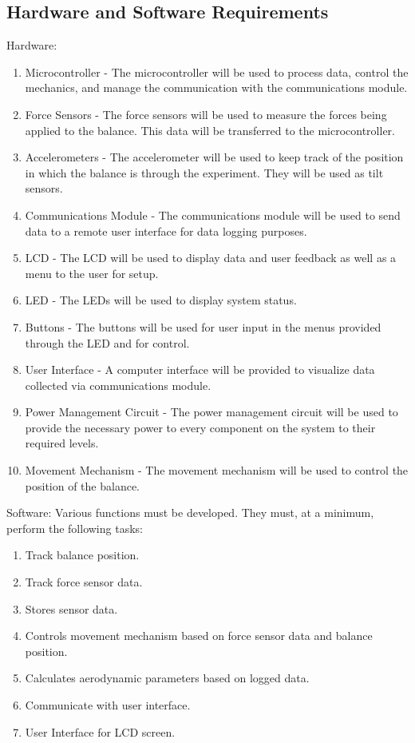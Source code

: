 	\subsection{Hardware and Software Requirements}
	Hardware:
		\begin{enumerate}
		\item Microcontroller - The microcontroller will be used to process data, control the mechanics, and manage the communication with the communications module.

 		\item Force Sensors - The force sensors will be used to measure the forces being applied to the balance. This data will be transferred to the microcontroller.
 
 		\item Accelerometers - The accelerometer will be used to keep track of the position in which the balance is through the experiment. They will be used as tilt sensors.

 		\item Communications Module - The communications module will be used to send data to a remote user interface for data logging purposes.

		\item LCD - The LCD will be used to display data and user feedback as well as a menu to the user for setup.

		\item LED - The LEDs will be used to display system status.

		\item Buttons - The buttons will be used for user input in the menus provided through the LED and for control.

		\item User Interface - A computer interface will be provided to visualize data collected via communications module.

		\item Power Management Circuit -  The power management circuit will be used to provide the necessary power to every component on the system to their required levels.

		\item Movement Mechanism - The movement mechanism will be used to control the position of the balance.
	\end{enumerate}
	Software:
	Various functions must be developed. They must, at a minimum, perform the following tasks: 
		\begin{enumerate}
			\item Track balance position.
			\item Track force sensor data.
			\item Stores sensor data.	
			\item Controls movement mechanism based on force sensor data and balance position.
			\item Calculates aerodynamic parameters based on logged data.
			\item Communicate with user interface.
			\item User Interface for LCD screen. 

		\end{enumerate}


